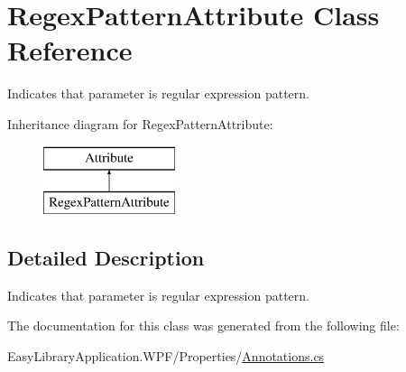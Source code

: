 \hypertarget{class_regex_pattern_attribute}{}\section{Regex\+Pattern\+Attribute Class Reference}
\label{class_regex_pattern_attribute}


Indicates that parameter is regular expression pattern.  


Inheritance diagram for Regex\+Pattern\+Attribute\+:\begin{figure}[H]
\begin{center}
\leavevmode
\includegraphics[height=2.000000cm]{class_regex_pattern_attribute}
\end{center}
\end{figure}


\subsection{Detailed Description}
Indicates that parameter is regular expression pattern. 



The documentation for this class was generated from the following file\+:\begin{DoxyCompactItemize}
\item 
Easy\+Library\+Application.\+W\+P\+F/\+Properties/\mbox{\hyperlink{_annotations_8cs}{Annotations.\+cs}}\end{DoxyCompactItemize}
